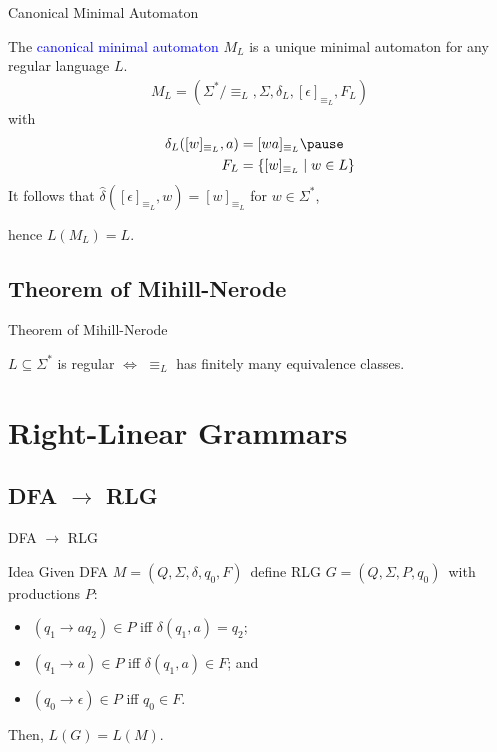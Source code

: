 \documentclass{beamer}
\def\padding{\vspace{0.5cm}}
\def\b{\textcolor{blue}}
\begin{document}
\begin{frame}{Canonical Minimal Automaton}
    \begin{definition}
        The \b{canonical minimal automaton} $M_L$ is a unique minimal automaton for any regular language $L$.\pause
        \begin{align*}
            M_L = (\Sigma^*/{\equiv_L}, \Sigma, \delta_L, [\epsilon]_{\equiv_L}, F_L)
        \end{align*}\pause
        with
        \begin{align*}
            \delta_L([w]_{\equiv_L}, a) &= [wa]_{\equiv_L}\pause \\
            F_L &= \{[w]_{\equiv_L} \mid w \in L\}
        \end{align*}\pause
        It follows that $\hat{\delta}([\epsilon]_{\equiv_L}, w) = [w]_{\equiv_L}$ for $w \in \Sigma^*$,\pause\par
        hence $L(M_L) = L$.
    \end{definition}
\end{frame}

\subsection{Theorem of Mihill-Nerode}

\begin{frame}{Theorem of Mihill-Nerode}
    \begin{theorem}
        $L \subseteq \Sigma^*$ is regular $\iff$ $\equiv_L$ has finitely many equivalence classes.
    \end{theorem}
\end{frame}

\section{Right-Linear Grammars}

\subsection{DFA $\to$ RLG}

\begin{frame}{DFA $\to$ RLG}
    \begin{block}{Idea}
        Given DFA $M = (Q, \Sigma, \delta, q_0, F)$\pause\ define RLG $G = (Q, \Sigma, P, q_0)$\pause\ with productions $P$:\pause
        \begin{itemize}
            \item $(q_1 \to a q_2) \in P$ iff $\delta(q_1, a) = q_2$\pause;
            \item $(q_1 \to a) \in P$ iff $\delta(q_1, a) \in F$\pause; and
            \item $(q_0 \to \epsilon) \in P$ iff $q_0 \in F$.
        \end{itemize}\pause\padding
        Then, $L(G) = L(M)$.
    \end{block}
\end{frame}
\end{document}
